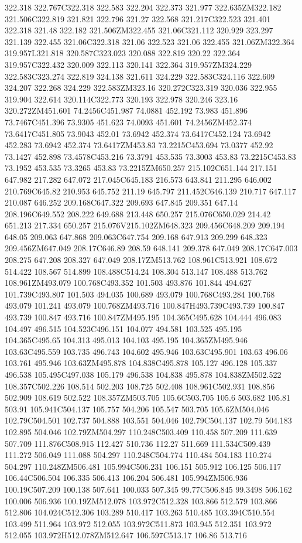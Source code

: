 322.318 322.767C322.318 322.583 322.204 322.373 321.977 322.635ZM322.182 321.506C322.819 321.821 322.796 321.27 322.568 321.217C322.523 321.401 322.318 321.48 322.182 321.506ZM322.455 321.06C321.112 320.929 323.297 321.139 322.455 321.06C322.318 321.06 322.523 321.06 322.455 321.06ZM322.364 319.957L321.818 320.587C323.023 320.088 322.819 320.22 322.364 319.957C322.432 320.009 322.113 320.141 322.364 319.957ZM324.229 322.583C323.274 322.819 324.138 321.611 324.229 322.583C324.116 322.609 324.207 322.268 324.229 322.583ZM323.16 320.272C323.319 320.036 322.955 319.904 322.614 320.114C322.773 320.193 322.978 320.246 323.16 320.272ZM451.601 74.2456C451.987 74.0881 452.192 73.983 451.896 73.7467C451.396 73.9305 451.623 74.0093 451.601 74.2456ZM452.374 73.6417C451.805 73.9043 452.01 73.6942 452.374 73.6417C452.124 73.6942 452.283 73.6942 452.374 73.6417ZM453.83 73.2215C453.694 73.0377 452.92 73.1427 452.898 73.4578C453.216 73.3791 453.535 73.3003 453.83 73.2215C453.83 73.1952 453.535 73.3265 453.83 73.2215ZM650.257 215.102C651.144 217.151 647.982 217.282 647.072 217.045C645.183 216.573 643.841 211.295 646.002 210.769C645.82 210.953 645.752 211.19 645.797 211.452C646.139 210.717 647.117 210.087 646.252 209.168C647.322 209.693 647.845 209.351 647.14 208.196C649.552 208.222 649.688 213.448 650.257 215.076C650.029 214.42 651.213 217.334 650.257 215.076V215.102ZM648.323 209.456C648.209 209.194 648.05 209.063 647.868 209.063C647.754 209.168 647.913 209.299 648.323 209.456ZM647.049 208.17C646.89 208.59 648.141 209.378 647.049 208.17C647.003 208.275 647.208 208.327 647.049 208.17ZM513.762 108.961C513.921 108.672 514.422 108.567 514.899 108.488C514.24 108.304 513.147 108.488 513.762 108.961ZM493.079 100.768C493.352 101.503 493.876 101.844 494.627 101.739C493.807 101.503 494.035 100.689 493.079 100.768C493.284 100.768 493.079 101.241 493.079 100.768ZM493.716 100.847H493.739C493.739 100.847 493.739 100.847 493.716 100.847ZM495.195 104.365C495.628 104.444 496.083 104.497 496.515 104.523C496.151 104.077 494.581 103.525 495.195 104.365C495.65 104.313 495.013 104.103 495.195 104.365ZM495.946 103.63C495.559 103.735 496.743 104.602 495.946 103.63C495.901 103.63 496.06 103.761 495.946 103.63ZM495.878 104.838C495.878 105.127 496.128 105.337 496.538 105.495C497.038 105.179 496.538 104.838 495.878 104.838ZM502.522 108.357C502.226 108.514 502.203 108.725 502.408 108.961C502.931 108.856 502.909 108.619 502.522 108.357ZM503.705 105.6C503.705 105.6 503.682 105.81 503.91 105.941C504.137 105.757 504.206 105.547 503.705 105.6ZM504.046 102.79C504.501 102.737 504.888 103.551 504.046 102.79C504.137 102.79 504.183 102.895 504.046 102.79ZM504.297 110.248C503.409 110.458 507.209 111.639 507.709 111.876C508.915 112.427 510.736 112.27 511.669 111.534C509.439 111.272 506.049 111.088 504.297 110.248C504.774 110.484 504.183 110.274 504.297 110.248ZM506.481 105.994C506.231 106.151 505.912 106.125 506.117 106.44C506.504 106.335 506.413 106.204 506.481 105.994ZM506.936 100.19C507.209 100.138 507.641 100.033 507.345 99.77C506.845 99.3498 506.162 100.006 506.936 100.19ZM512.078 103.972C512.328 103.866 512.579 103.866 512.806 104.024C512.306 103.289 510.417 103.263 510.485 103.394C510.554 103.499 511.964 103.972 512.055 103.972C511.873 103.945 512.351 103.972 512.055 103.972H512.078ZM512.647 106.597C513.17 106.86 513.716 